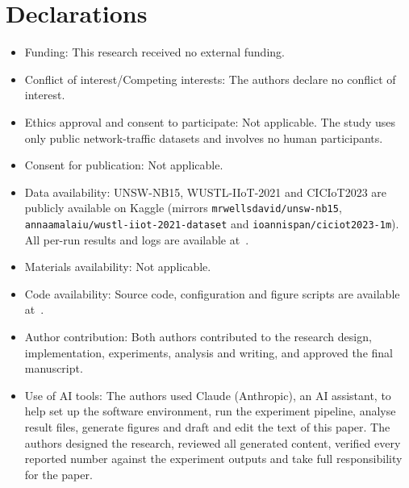 \documentclass[pdflatex,sn-mathphys-num]{sn-jnl}%
\begin{document}
\section*{Declarations}

\begin{itemize}
\item Funding: This research received no external funding.
\item Conflict of interest/Competing interests: The authors declare no conflict of interest.
\item Ethics approval and consent to participate: Not applicable. The study uses only public network-traffic datasets and involves no human participants.
\item Consent for publication: Not applicable.
\item Data availability: UNSW-NB15, WUSTL-IIoT-2021 and CICIoT2023 are publicly available on Kaggle (mirrors \texttt{mrwellsdavid/unsw-nb15}, \texttt{annaamalaiu/wustl-iiot-2021-dataset} and \texttt{ioannispan/ciciot2023-1m}). All per-run results and logs are available at~\cite{repo}.
\item Materials availability: Not applicable.
\item Code availability: Source code, configuration and figure scripts are available at~\cite{repo}.
\item Author contribution: Both authors contributed to the research design, implementation, experiments, analysis and writing, and approved the final manuscript.
\item Use of AI tools: The authors used Claude (Anthropic), an AI assistant, to help set up the software environment, run the experiment pipeline, analyse result files, generate figures and draft and edit the text of this paper. The authors designed the research, reviewed all generated content, verified every reported number against the experiment outputs and take full responsibility for the paper.
\end{itemize}

\end{document}
